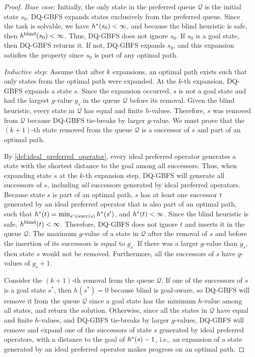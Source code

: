\documentclass[ppgc,diss,english]{iiufrgs}
\begin{document}
\begin{proof}
\textit{Base case}: Initially, the only state in the preferred queue $\mathcal{Q}$ is the initial state $s_{0}$. DQ-GBFS expands states exclusively from the preferred queue. Since the task is solvable, we have $h^*({s_{0}}) < \infty$,  and because the blind heuristic is safe, then $h^{\text{blind}}(s_{0}) < \infty$. Thus, DQ-GBFS does not ignore $s_{0}$. If $s_{0}$ is a goal state, then DQ-GBFS returns it. If not, DQ-GBFS expands $s_{0}$, and this expansion satisfies the property since $s_{0}$ is part of any optimal path.

\textit{Inductive step}: Assume that after $k$ expansions, an optimal path exists such that only states from the optimal path were expanded. At the $k$-th expansion, DQ-GBFS expands a state $s$. Since the expansion occurred, $s$ is not a goal state and had the largest $g$-value $g_{s}$ in the queue $\mathcal{Q}$ before its removal. Given the blind heuristic, every state in $\mathcal{Q}$ has equal and finite $h$-values. Therefore, $s$ was removed from $\mathcal{Q}$ because DQ-GBFS tie-breaks by larger $g$-value. We must prove that the $(k+1)$-th state removed from the queue $\mathcal{Q}$ is a successor of $s$ and part of an optimal path.

By \cref{def:ideal_preferred_operator}, every ideal preferred operator generates a state with the shortest distance to the goal among all successors. Thus, when expanding state $s$ at the $k$-th expansion step, DQ-GBFS will generate all successors of $s$, including \emph{all} successors generated by ideal preferred operators. Because state $s$ is part of an optimal path, $s$ has at least one successor $t$ generated by an ideal preferred operator that is also part of an optimal path, such that $h^*({t}) = \min_{s' \in \operatorname{succ}(s)} h^*({s'})$, and $h^*({t}) < \infty$. Since the blind heuristic is safe, $h^{\text{blind}}(t) < \infty$. Therefore, DQ-GBFS does not ignore $t$ and inserts it in the queue $\mathcal{Q}$.
The maximum $g$-value of a state in $\mathcal{Q}$ after the removal of $s$ and before the insertion of its successors is equal to $g_{s}$. If there was a larger $g$-value than $g_{s}$, then state $s$ would not be removed. Furthermore, all the successors of $s$ have $g$-values of $g_{s} + 1$.

Consider the $(k+1)$-th removal from the queue $\mathcal{Q}$.
If one of the successors of $s$ is a goal state $s^{*}$, then $h(s^{*})=0$ because blind is goal-aware, so DQ-GBFS will remove it from the queue $\mathcal{Q}$ since a goal state has the minimum $h$-value among all states, and return the solution. Otherwise, since all the states in $\mathcal{Q}$ have equal and finite $h$-values, and DQ-GBFS tie-breaks by larger $g$-values, DQ-GBFS will remove and expand one of the successors of state $s$ generated by ideal preferred operators, with a distance to the goal of $h^*({s}) - 1$, i.e., an expansion of a state generated by an ideal preferred operator makes progress on an optimal path.


\end{proof}
\end{document}
